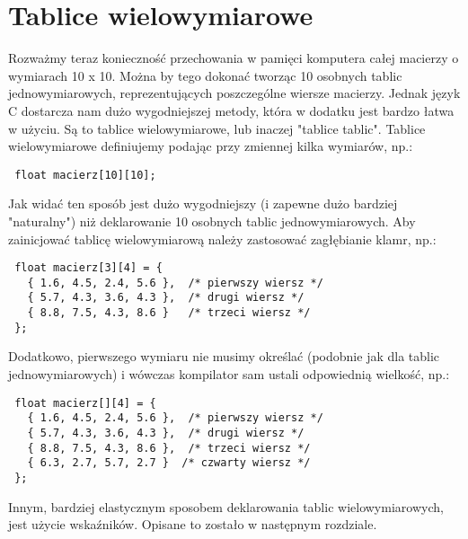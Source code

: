 \documentclass[11pt,a4paper]{article}
\begin{document}
\section*{Tablice wielowymiarowe}
Rozważmy teraz konieczność przechowania w pamięci komputera całej macierzy o wymiarach 10 x 10. Można by tego dokonać tworząc 10 osobnych tablic jednowymiarowych, reprezentujących poszczególne wiersze macierzy. Jednak język C dostarcza nam dużo wygodniejszej metody, która w dodatku jest bardzo łatwa w użyciu. Są to tablice wielowymiarowe, lub inaczej "tablice tablic". Tablice wielowymiarowe definiujemy podając przy zmiennej kilka wymiarów, np.:
\begin{lstlisting}
 float macierz[10][10];
\end{lstlisting}
Jak widać ten sposób jest dużo wygodniejszy (i zapewne dużo bardziej "naturalny") niż deklarowanie 10 osobnych tablic jednowymiarowych. Aby zainicjować tablicę wielowymiarową należy zastosować zagłębianie klamr, np.:
\begin{lstlisting}
 float macierz[3][4] = {
   { 1.6, 4.5, 2.4, 5.6 },  /* pierwszy wiersz */
   { 5.7, 4.3, 3.6, 4.3 },  /* drugi wiersz */
   { 8.8, 7.5, 4.3, 8.6 }   /* trzeci wiersz */
 };
\end{lstlisting}
Dodatkowo, pierwszego wymiaru nie musimy określać (podobnie jak dla tablic jednowymiarowych) i wówczas kompilator sam ustali odpowiednią wielkość, np.:
\begin{lstlisting}
 float macierz[][4] = {
   { 1.6, 4.5, 2.4, 5.6 },  /* pierwszy wiersz */
   { 5.7, 4.3, 3.6, 4.3 },  /* drugi wiersz */
   { 8.8, 7.5, 4.3, 8.6 },  /* trzeci wiersz */
   { 6.3, 2.7, 5.7, 2.7 }  /* czwarty wiersz */
 };
\end{lstlisting}
Innym, bardziej elastycznym sposobem deklarowania tablic wielowymiarowych, jest użycie wskaźników. Opisane to zostało w następnym rozdziale.
\end{document}
